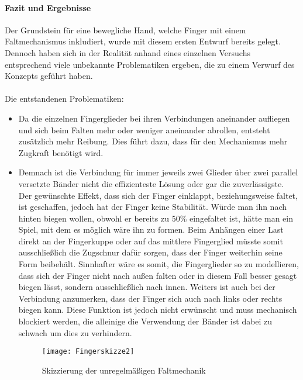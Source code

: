 \documentclass[titlepage,12pt,twoside]{article}
\begin{document}
\paragraph{Fazit und Ergebnisse}
\label{par:Fazit und Ergebnisse}
\hfill \break
\hfill \break
Der Grundstein für eine bewegliche Hand, welche Finger mit einem 
Faltmechanismus inkludiert, wurde mit diesem ersten Entwurf bereits gelegt. 
Dennoch haben sich in der Realität anhand eines einzelnen Versuchs 
entsprechend viele unbekannte Problematiken ergeben, die zu einem Verwurf des 
Konzepts geführt haben. \\
\\
Die entstandenen Problematiken:
\begin{itemize}
	\item Da die einzelnen Fingerglieder bei ihren Verbindungen aneinander 
	aufliegen und sich beim Falten mehr oder weniger aneinander abrollen, 
	entsteht zusätzlich mehr Reibung. Dies führt dazu, dass für den Mechanismus mehr Zugkraft benötigt wird.
	\item Demnach ist die Verbindung für immer jeweils zwei Glieder über zwei 
	parallel versetzte Bänder nicht die effizienteste Lösung oder gar die zuverlässigste. 
	Der gewünschte Effekt, dass sich der Finger einklappt, beziehungsweise 
	faltet, ist geschaffen, jedoch hat der Finger keine Stabilität. Würde man 
	ihn nach hinten biegen wollen, obwohl er bereits zu 50\% eingefaltet ist, 
	hätte man ein Spiel, mit dem es möglich wäre ihn zu formen. Beim Anhängen 
	einer Last direkt an der Fingerkuppe oder auf das mittlere Fingerglied 
	müsste somit ausschließlich die Zugschnur dafür sorgen, dass der Finger 
	weiterhin seine Form beibehält. Sinnhafter wäre es somit, die Fingerglieder 
	so zu modellieren, dass sich der Finger nicht nach außen falten oder in 
	diesem Fall besser gesagt biegen lässt, sondern ausschließlich nach innen. 
	Weiters ist auch bei der Verbindung anzumerken, dass der Finger sich auch 
	nach links oder rechts biegen kann. Diese Funktion ist jedoch nicht 
	erwünscht und muss mechanisch blockiert werden, die alleinige die Verwendung der 
	Bänder ist dabei zu schwach um dies zu verhindern.
	\begin{figure}[H]
		\begin{center}
			\scalebox{1.2}
			{\texttt{[image: Fingerskizze2]}}
			\caption{Skizzierung der unregelmäßigen Faltmechanik}
			\label{fig:Fingerskizze2}			
		\end{center}
	\end{figure}
	\hfill \break

\end{itemize}
\end{document}
